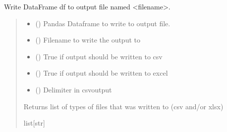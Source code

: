 \documentclass[letterpaper,10pt,english]{sphinxmanual}
\begin{document}
\begin{fulllineitems}
\label{\detokenize{write_subsets:write_subsets.write_output}}
\pysigstartsignatures
{}
\pysigstopsignatures
\sphinxAtStartPar
Write DataFrame df to output file named \textless{}filename\textgreater{}.
\begin{quote}\begin{description}
\begin{itemize}
\item {} 
\sphinxAtStartPar
{} () \textendash{} Pandas Dataframe to write to output file.

\item {} 
\sphinxAtStartPar
{} () \textendash{} Filename to write the output to

\item {} 
\sphinxAtStartPar
{} () \textendash{} True if output should be written to csv

\item {} 
\sphinxAtStartPar
{} () \textendash{} True if output should be written to excel

\item {} 
\sphinxAtStartPar
{} () \textendash{} Delimiter in csv\sphinxhyphen{}output

\end{itemize}

\sphinxAtStartPar
Returns list of types of files that was written to (csv and/or xlsx)

\sphinxAtStartPar
list{[}str{]}

\end{description}\end{quote}

\end{fulllineitems}
\end{document}
